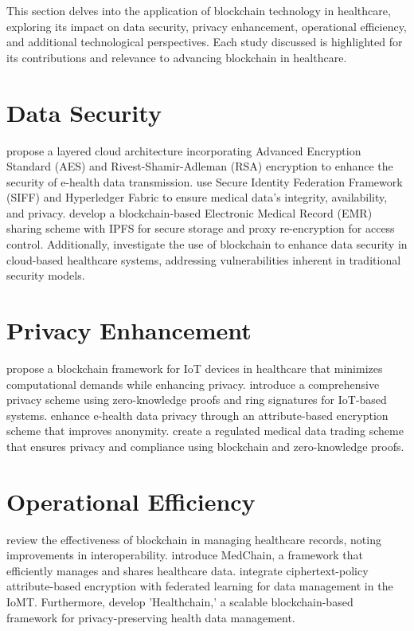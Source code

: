 \documentclass[cic,tc,english]{iiufrgs}
\begin{document}
    This section delves into the application of blockchain technology in healthcare, exploring its impact on data security, privacy enhancement, operational efficiency, and additional technological perspectives. Each study discussed is highlighted for its contributions and relevance to advancing blockchain in healthcare.



    
    \section{Data Security} 
        \citet{Memos2021} propose a layered cloud architecture incorporating Advanced Encryption Standard (AES) and Rivest-Shamir-Adleman (RSA) encryption to enhance the security of e-health data transmission. \citet{Tian2019} use Secure Identity Federation Framework (SIFF) and Hyperledger Fabric to ensure medical data's integrity, availability, and privacy. \citet{Liu2024} develop a blockchain-based Electronic Medical Record (EMR) sharing scheme with IPFS for secure storage and proxy re-encryption for access control. Additionally, \citet{Esposito2018} investigate the use of blockchain to enhance data security in cloud-based healthcare systems, addressing vulnerabilities inherent in traditional security models.
    
    \section{Privacy Enhancement} 
        \citet{Dwivedi2019} propose a blockchain framework for IoT devices in healthcare that minimizes computational demands while enhancing privacy. \citet{Esfahani2024} introduce a comprehensive privacy scheme using zero-knowledge proofs and ring signatures for IoT-based systems. \citet{Zala2024} enhance e-health data privacy through an attribute-based encryption scheme that improves anonymity. \citet{Li2024} create a regulated medical data trading scheme that ensures privacy and compliance using blockchain and zero-knowledge proofs.
    
    \section{Operational Efficiency} 
        \citet{Vazirani2019} review the effectiveness of blockchain in managing healthcare records, noting improvements in interoperability. \citet{Shen2019} introduce MedChain, a framework that efficiently manages and shares healthcare data. \citet{Bhansali2022} integrate ciphertext-policy attribute-based encryption with federated learning for data management in the IoMT. Furthermore, \citet{XuJie2019} develop 'Healthchain,' a scalable blockchain-based framework for privacy-preserving health data management.
    
\end{document}
